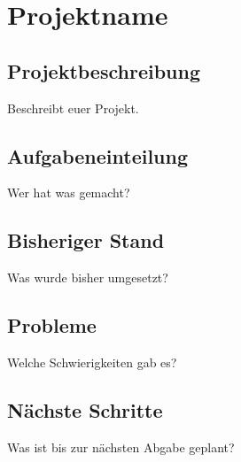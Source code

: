 \chapter{Projektname}

\section{Projektbeschreibung}

Beschreibt euer Projekt.

\section{Aufgabeneinteilung}

Wer hat was gemacht?

\section{Bisheriger Stand}

Was wurde bisher umgesetzt?

\section{Probleme}

Welche Schwierigkeiten gab es?

\section{Nächste Schritte}

Was ist bis zur nächsten Abgabe geplant?